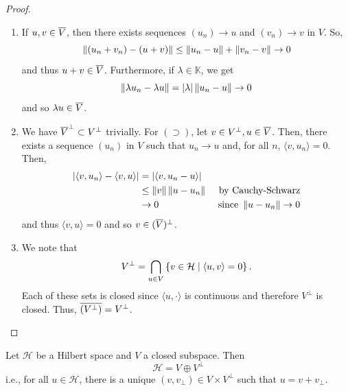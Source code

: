 \documentclass[11pt,leqno,oneside]{amsbook}
\numberwithin{thm}{section}
\newcommand{\K}{\mathbb{K}} %
\renewcommand{\H}{\mathcal{H}} %
\begin{document}
\begin{proof}
  \begin{enumerate}
  \item   If \(u,v \in \ov{V}\), then there exists sequences \((u_n) \to u\)
  and \((v_n) \to v\) in \(V\). So, \[
    \norm[(u_n+v_n) - (u+v)] \leq \norm[u_n-u] + \norm[v_n - v] \to 0
  \]
  and thus \(u+v \in \ov{V}\). Furthermore, if \(\lambda \in \K\), we
  get \[
    \norm[\lambda u_n - \lambda u] = |\lambda|\norm[u_n-u] \to 0
  \]
  and so \(\lambda u \in \ov{V}\).
  \item We have \(\ov{V}^\perp \subset V^\perp\) trivially. For
    \((\supset)\), let \(v \in V^\perp, u \in \ov{V}\). Then, there
    exists a sequence \((u_n)\) in \(V\) such that \(u_n \to u\) and,
    for all \(n\), \(\langle v,u_n \rangle = 0\). Then,
    \begin{align*}
      \left| \langle v,u_n \rangle - \langle v,u \rangle \right|
      & = |\langle v,u_n-u\rangle| \\
      & \leq \norm[v]\norm[u-u_n] & \text{ by Cauchy-Schwarz} \\
      & \to 0 & \text{ since }\norm[u-u_n] \to 0
    \end{align*}
    and thus \(\langle v,u \rangle = 0\) and so \(v \in
    (\ov{V})^\perp\).
  \item We note that \[
      V^\perp = \Intersect_{u \in V} \left\{ v \in \H \st \langle u,v
        \rangle = 0 \right\}.
    \]
    Each of these sets is closed since \(\langle u,\cdot \rangle\) is
    continuous and therefore \(V^\perp\) is closed. Thus,
    \(\ov{(V^\perp)} = V^\perp\).
  \end{enumerate}
\end{proof}
\begin{thm}
  Let \(\H\) be a Hilbert space and \(V\) a closed subspace. Then \[
    \H = V \oplus V^\perp
  \]
  i.e., for all \(u \in \H\), there is a unique \((v,v_\perp) \in V
  \times V^\perp\) such that \(u = v+v_\perp\).
\end{thm}
\end{document}
